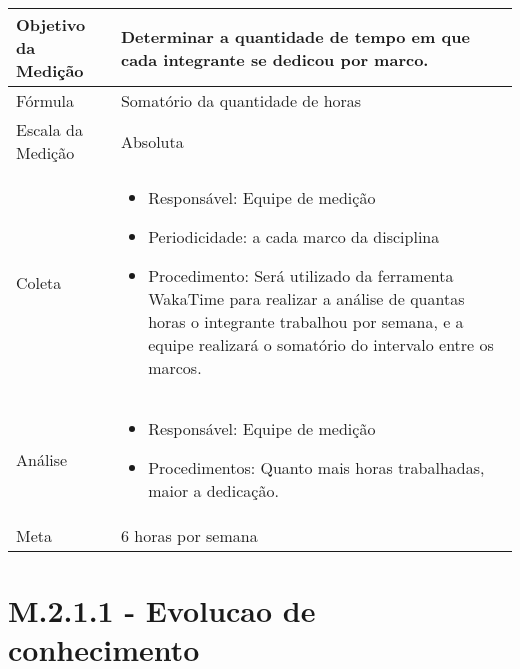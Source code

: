 	\begin{tabular}{ |p{4cm}|p{8cm}|  }
	 \hline
	 Objetivo da Medição 		& Determinar a quantidade de tempo em que cada integrante se dedicou por marco.	   \\ %
	 \hline
	 Fórmula		&  Somatório da quantidade de horas	\\
	 \hline
	 Escala da Medição 		& Absoluta		 \\
	 \hline
	 Coleta		& 	\begin{itemize} \item Responsável: Equipe de medição \item Periodicidade: a cada marco da disciplina \item Procedimento: Será utilizado da ferramenta WakaTime para realizar a análise de quantas horas o integrante trabalhou por semana, e a equipe realizará o somatório do intervalo entre os marcos.\end{itemize}	\\
	 \hline
	 Análise		& 	\begin{itemize} \item Responsável: Equipe de medição \item Procedimentos: Quanto mais horas trabalhadas, maior a dedicação. \end{itemize}	 \\
	 \hline
	 Meta		& 	6 horas por semana	 \\
	 \hline
	\end{tabular}

	\section{M.2.1.1 - Evolucao de conhecimento} %

